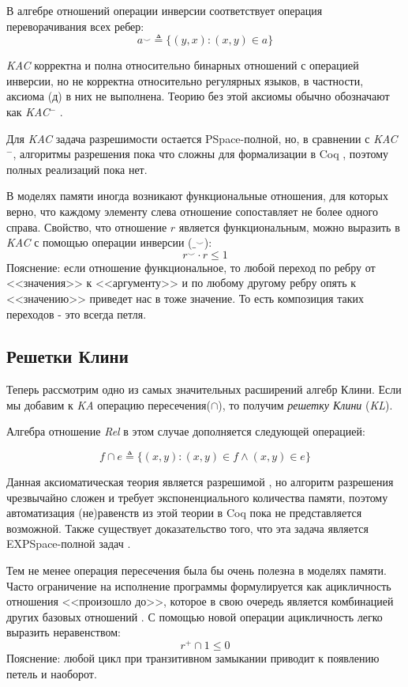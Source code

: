 \documentclass[times
              ,specification
              ,annotation
              ]{itmo-student-thesis}
\begin{document}
      В алгебре отношений операции инверсии соответствует операция переворачивания всех ребер:
      $$ a^\smile \triangleq \{ (y, x): (x, y) \in a \} $$

      \textit{KAC} корректна и полна относительно бинарных отношений с операцией инверсии, но не
      корректна относительно регулярных языков, в частности, аксиома (д) в них не выполнена. Теорию без
      этой аксиомы обычно обозначают как \textit{KAC}$^-$ \cite{AlgebrasOfRelation}.

      Для \textit{KAC} задача разрешимости остается PSpace-полной, но, в сравнении с \textit{KAC}$^-$,
      алгоритмы разрешения пока что сложны для формализации в Coq \cite{AlgebrasOfRelation}, поэтому
      полных реализаций пока нет.

      В моделях памяти иногда возникают функциональные отношения, для которых верно, что каждому
      элементу слева отношение сопоставляет не более одного справа.
      Свойство, что отношение $ r $ является функциональным, можно выразить в
      \textit{KAC} с помощью операции инверсии ($ \_^{\smile} $):
      $$ r^{\smile} \cdot r \leq 1 $$
      Пояснение: если отношение функциональное, то любой переход по ребру от <<значения>> к
      <<аргументу>> и по любому другому ребру опять к <<значению>> приведет нас в тоже значение. То
      есть композиция таких переходов - это всегда петля.

    \subsection{Решетки Клини}
      Теперь рассмотрим одно из самых значительных расширений алгебр Клини.
      Если мы добавим к \textit{KA} операцию пересечения($\cap$),
      то получим \textit{решетку Клини} (\textit{KL}).

      Алгебра отношение \textit{Rel} в этом случае дополняется следующей операцией:

      $$ f \cap e \triangleq \{ (x, y) \colon (x, y) \in f \wedge (x, y) \in e \} $$

      Данная аксиоматическая теория является разрешимой \cite{petri_for_kal}, но алгоритм разрешения чрезвычайно
      сложен и требует экспоненциального количества памяти, поэтому автоматизация (не)равенств из этой
      теории в Coq пока не представляется возможной. Также существует доказательство того, что
      эта задача является EXPSpace-полной задач \cite{complexity_of_regular_intersection}.
      
      Тем не менее операция пересечения была бы очень полезна в моделях памяти.
      Часто ограничение на исполнение программы формулируется как ацикличность отношения <<произошло
      до>>, которое в свою очередь является комбинацией других базовых отношений \cite{rc11}. С помощью
      новой операции ацикличность легко выразить неравенством:
      $$ r^+ \cap 1 \leq 0 $$
      Пояснение: любой цикл при транзитивном замыкании приводит к появлению петель и наоборот.
\end{document}
